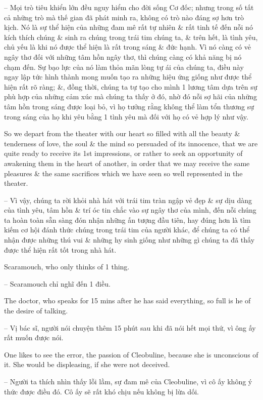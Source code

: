 \documentclass{article}
\begin{document}
\begin{enumerate}
\begin{itemize}
		-- Mọi trò tiêu khiển lớn đều nguy hiểm cho đời sống Cơ đốc; nhưng trong số tất cả những trò mà thế gian đã phát minh ra, không có trò nào đáng sợ hơn trò kịch. Nó là sự thể hiện của những đam mê rất tự nhiên \& rất tinh tế đến nỗi nó kích thích chúng \& sinh ra chúng trong trái tim chúng ta, \& trên hết, là tình yêu, chủ yếu là khi nó được thể hiện là rất trong sáng \& đức hạnh. Vì nó càng có vẻ ngây thơ đối với những tâm hồn ngây thơ, thì chúng càng có khả năng bị nó chạm đến. Sự bạo lực của nó làm thỏa mãn lòng tự ái của chúng ta, điều này ngay lập tức hình thành mong muốn tạo ra những hiệu ứng giống như được thể hiện rất rõ ràng; \&, đồng thời, chúng ta tự tạo cho mình 1 lương tâm dựa trên sự phù hợp của những cảm xúc mà chúng ta thấy ở đó, nhờ đó nỗi sợ hãi của những tâm hồn trong sáng được loại bỏ, vì họ tưởng rằng không thể làm tổn thương sự trong sáng của họ khi yêu bằng 1 tình yêu mà đối với họ có vẻ hợp lý như vậy.
		
		So we depart from the theater with our heart so filled with all the beauty \& tenderness of love, the soul \& the mind so persuaded of its innocence, that we are quite ready to receive its 1st impressions, or rather to seek an opportunity of awakening them in the heart of another, in order that we may receive the same pleasures \& the same sacrifices which we have seen so well represented in the theater.
		
		-- Vì vậy, chúng ta rời khỏi nhà hát với trái tim tràn ngập vẻ đẹp \& sự dịu dàng của tình yêu, tâm hồn \& trí óc tin chắc vào sự ngây thơ của mình, đến nỗi chúng ta hoàn toàn sẵn sàng đón nhận những ấn tượng đầu tiên, hay đúng hơn là tìm kiếm cơ hội đánh thức chúng trong trái tim của người khác, để chúng ta có thể nhận được những thú vui \& những hy sinh giống như những gì chúng ta đã thấy được thể hiện rất tốt trong nhà hát.
		
		 Scaramouch, who only thinks of 1 thing.
		
		-- Scaramouch chỉ nghĩ đến 1 điều.
		
		The doctor, who speaks for 15 mins after he has said everything, so full is he of the desire of talking.
		
		-- Vị bác sĩ, người nói chuyện thêm 15 phút sau khi đã nói hết mọi thứ, vì ông ấy rất muốn được nói.
		
		 One likes to see the error, the passion of Cleobuline, because she is unconscious of it. She would be displeasing, if she were not deceived.
		
		-- Người ta thích nhìn thấy lỗi lầm, sự đam mê của Cleobuline, vì cô ấy không ý thức được điều đó. Cô ấy sẽ rất khó chịu nếu không bị lừa dối.
		

\end{itemize}
\end{enumerate}
\end{document}
